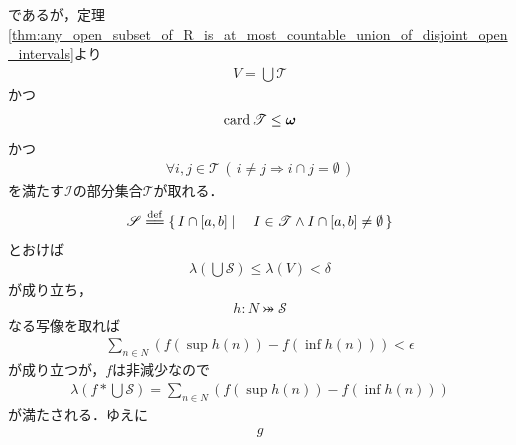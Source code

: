 \begin{sketch}
		であるが，定理\ref{thm:any_open_subset_of_R_is_at_most_countable_union_of_disjoint_open_intervals}より
		\begin{align}
			V = \bigcup \mathscr{T}
		\end{align}
		かつ
		\begin{align}
			\operatorname{card} \mathscr{T} \leq {\boldsymbol \omega}
		\end{align}
		かつ
		\begin{align}
			\forall i,j \in \mathscr{T}\, (\, i \neq j \Longrightarrow i \cap j = \emptyset\, )
		\end{align}
		を満たす$\mathscr{I}$の部分集合$\mathscr{T}$が取れる．
		\begin{align}
			\mathscr{S} \defeq \Set{I \cap [a,b]}{I \in \mathscr{T} \wedge I \cap [a,b] \neq \emptyset}
		\end{align}
		とおけば
		\begin{align}
			\lambda\left(\bigcup \mathscr{S}\right) \leq \lambda(V) < \delta
		\end{align}
		が成り立ち，
		\begin{align}
			h:N \bij \mathscr{S}
		\end{align}
		なる写像を取れば
		\begin{align}
			\sum_{n \in N} \left(f(\sup{}{h(n)}) - f(\inf{}{h(n)})\right) < \epsilon
		\end{align}
		が成り立つが，$f$は非減少なので
		\begin{align}
			\lambda\left(f \ast \bigcup \mathscr{S}\right) = \sum_{n \in N} \left(f(\sup{}{h(n)}) - f(\inf{}{h(n)})\right)
		\end{align}
		が満たされる．ゆえに
		\begin{align}
			g
		\end{align}
	\end{sketch}
	
	\begin{screen}
		\begin{thm}[絶対連続関数の総変動関数も絶対連続である]
			
		\end{thm}
	\end{screen}
	
	\begin{screen}
		\begin{thm}[微分積分学の基本定理]
		\end{thm}
	\end{screen}